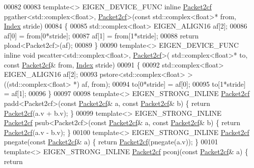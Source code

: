 \begin{DoxyCode}
00082 
00083 \textcolor{keyword}{template}<> EIGEN\_DEVICE\_FUNC \textcolor{keyword}{inline} \hyperlink{struct_eigen_1_1internal_1_1_packet2cf}{Packet2cf} pgather<std::complex<float>, 
      \hyperlink{struct_eigen_1_1internal_1_1_packet2cf}{Packet2cf}>(\textcolor{keyword}{const} std::complex<float>* from, \hyperlink{namespace_eigen_a62e77e0933482dafde8fe197d9a2cfde}{Index} stride)
00084 \{
00085   std::complex<float> EIGEN\_ALIGN16 af[2];
00086   af[0] = from[0*stride];
00087   af[1] = from[1*stride];
00088   \textcolor{keywordflow}{return} pload<Packet2cf>(af);
00089 \}
00090 \textcolor{keyword}{template}<> EIGEN\_DEVICE\_FUNC \textcolor{keyword}{inline} \textcolor{keywordtype}{void} pscatter<std::complex<float>, \hyperlink{struct_eigen_1_1internal_1_1_packet2cf}{Packet2cf}>(
      std::complex<float>* to, \textcolor{keyword}{const} \hyperlink{struct_eigen_1_1internal_1_1_packet2cf}{Packet2cf}& from, \hyperlink{namespace_eigen_a62e77e0933482dafde8fe197d9a2cfde}{Index} stride)
00091 \{
00092   std::complex<float> EIGEN\_ALIGN16 af[2];
00093   pstore<std::complex<float> >((std::complex<float> *) af, from);
00094   to[0*stride] = af[0];
00095   to[1*stride] = af[1];
00096 \}
00097 
00098 \textcolor{keyword}{template}<> EIGEN\_STRONG\_INLINE \hyperlink{struct_eigen_1_1internal_1_1_packet2cf}{Packet2cf} padd<Packet2cf>(\textcolor{keyword}{const} 
      \hyperlink{struct_eigen_1_1internal_1_1_packet2cf}{Packet2cf}& a, \textcolor{keyword}{const} \hyperlink{struct_eigen_1_1internal_1_1_packet2cf}{Packet2cf}& b) \{ \textcolor{keywordflow}{return} \hyperlink{struct_eigen_1_1internal_1_1_packet2cf}{Packet2cf}(a.v + b.v); \}
00099 \textcolor{keyword}{template}<> EIGEN\_STRONG\_INLINE \hyperlink{struct_eigen_1_1internal_1_1_packet2cf}{Packet2cf} psub<Packet2cf>(\textcolor{keyword}{const} 
      \hyperlink{struct_eigen_1_1internal_1_1_packet2cf}{Packet2cf}& a, \textcolor{keyword}{const} \hyperlink{struct_eigen_1_1internal_1_1_packet2cf}{Packet2cf}& b) \{ \textcolor{keywordflow}{return} \hyperlink{struct_eigen_1_1internal_1_1_packet2cf}{Packet2cf}(a.v - b.v); \}
00100 \textcolor{keyword}{template}<> EIGEN\_STRONG\_INLINE \hyperlink{struct_eigen_1_1internal_1_1_packet2cf}{Packet2cf} pnegate(\textcolor{keyword}{const} \hyperlink{struct_eigen_1_1internal_1_1_packet2cf}{Packet2cf}& a) \{ \textcolor{keywordflow}{return} 
      \hyperlink{struct_eigen_1_1internal_1_1_packet2cf}{Packet2cf}(pnegate(a.v)); \}
00101 \textcolor{keyword}{template}<> EIGEN\_STRONG\_INLINE \hyperlink{struct_eigen_1_1internal_1_1_packet2cf}{Packet2cf} pconj(\textcolor{keyword}{const} \hyperlink{struct_eigen_1_1internal_1_1_packet2cf}{Packet2cf}& a) \{ \textcolor{keywordflow}{return} 

\end{DoxyCode}
